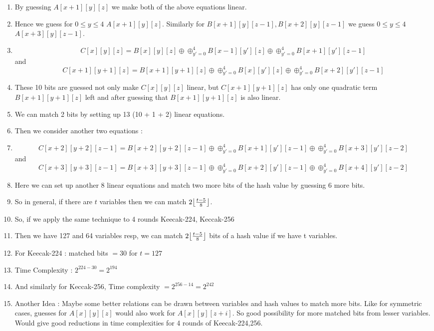 \documentclass{article}
\DeclarePairedDelimiter\floor{\lfloor}{\rfloor}
\begin{document}
\begin{enumerate}
	\item By guessing $A[x+1][y][z]$ we make both of the above equations linear.
	
	\item Hence we guess for $0 \leq y \leq 4$ $A[x+1][y][z]$. Similarly for $B[x+1][y][z-1], B[x+2][y][z-1]$ we guess $0 \leq y \leq 4$ $A[x+3][y][z-1]$. 
	\item 
		\[
        C[x][y][z] = B[x][y][z] \oplus \oplus_{y' = 0}^{4} B[x-1][y'][z] \oplus \oplus_{y' = 0}^{4} B[x+1][y'][z-1]
    \] and 
		\[
        C[x+1][y+1][z] = B[x+1][y+1][z] \oplus \oplus_{y' = 0}^{4} B[x][y'][z] \oplus \oplus_{y' = 0}^{4} B[x+2][y'][z-1]
    \]

    \item These 10 bits are guessed not only make $C[x][y][z]$ linear, but $C[x+1][y+1][z]$ has only one quadratic term $B[x+1][y+1][z]$ left and after guessing that $B[x+1][y+1][z]$ is also linear. 
    
    \item We can match 2 bits by setting up 13 (10 + 1 + 2) linear equations. 
    
    \item Then we consider another two equations :
    
    \item 	\[
        C[x + 2][y+2][z-1] = B[x + 2][y+2][z-1] \oplus \oplus_{y' = 0}^{4} B[x+1][y'][z-1] \oplus \oplus_{y' = 0}^{4} B[x+3][y'][z-2]
    \] and 
		\[
        C[x+3][y+3][z-1] = B[x+3][y+3][z-1] \oplus \oplus_{y' = 0}^{4} B[x+2][y'][z-1] \oplus \oplus_{y' = 0}^{4} B[x+4][y'][z-2]
    \]
    
    \item Here we can set up another 8 linear equations and match two more bits of the hash value by guessing 6 more bits.
    
    \item So in general, if there are $t$ variables then we can match $2\floor*{\frac{t-5}{8}}$.
    
    \item So, if we apply the same technique to 4 rounds Keecak-224, Keccak-256
    \item Then we have 127 and 64 variables resp, we can match $2\floor*{\frac{t-5}{8}}$ bits of a hash value if we have t variables.
    \item For Keecak-224 : matched bits $= 30$ for $t = 127$
    \item Time Complexity : $2^{224 - 30} = 2^{194}$
    \item And similarly for Keccak-256, Time complexity $=2^{256 - 14} = 2^{242}$
    \item Another Idea : Maybe some better relations can be drawn between variables and hash values to match more bits. Like for symmetric cases, guesses for $A[x][y][z]$ would also work for $A[x][y][z + i]$. So good possibility for more matched bits from lesser variables. Would give good reductions in time complexities for 4 rounds of Keecak-224,256.
\end{enumerate}
\end{document}
